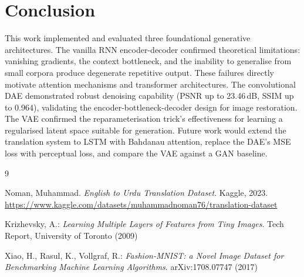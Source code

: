 \documentclass[runningheads]{llncs}
\begin{document}
\section{Conclusion}

This work implemented and evaluated three foundational generative
architectures. The vanilla RNN encoder-decoder confirmed theoretical
limitations: vanishing gradients, the context bottleneck, and the
inability to generalise from small corpora produce degenerate
repetitive output. These failures directly motivate attention
mechanisms and transformer architectures. The convolutional DAE
demonstrated robust denoising capability (PSNR up to 23.46\,dB,
SSIM up to 0.964), validating the encoder-bottleneck-decoder
design for image restoration. The VAE confirmed the reparameterisation
trick's effectiveness for learning a regularised latent space suitable
for generation. Future work would extend the translation system to
LSTM with Bahdanau attention, replace the DAE's MSE loss with
perceptual loss, and compare the VAE against a GAN baseline.

\begin{thebibliography}{9}

Noman, Muhammad. \textit{English to Urdu Translation Dataset}.
Kaggle, 2023. \url{https://www.kaggle.com/datasets/muhammadnoman76/translation-dataset}

Krizhevsky, A.: \textit{Learning Multiple Layers of Features from Tiny Images}.
Tech Report, University of Toronto (2009)

Xiao, H., Rasul, K., Vollgraf, R.: \textit{Fashion-MNIST: a Novel Image Dataset
for Benchmarking Machine Learning Algorithms}. arXiv:1708.07747 (2017)

\end{thebibliography}
\end{document}
